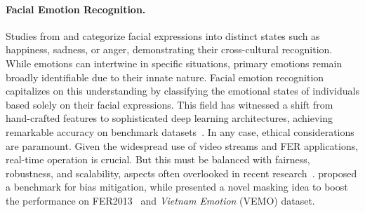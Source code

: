 \paragraph{Facial Emotion Recognition.}
Studies from \citet{ekman1971constants} and \citet{LiD22a} categorize facial expressions into distinct states 
such as happiness, sadness, or anger, 
demonstrating their cross-cultural recognition. 
While emotions can intertwine in specific situations, 
primary emotions remain broadly identifiable due to their innate nature.
Facial emotion recognition capitalizes on this understanding by classifying the emotional states of individuals based solely on their facial expressions. 
This field has witnessed a shift from hand-crafted features to sophisticated deep learning architectures, 
achieving remarkable accuracy on benchmark datasets~\cite{FardM22,LiGL22}. 
In any case, ethical considerations are paramount. 
Given the widespread use of video streams and FER applications, 
real-time operation is crucial. 
But this must be balanced with fairness, robustness, and scalability, 
aspects often overlooked in recent research~\cite{Savchenko22}. 
\citet{WangQKGNHR20} proposed a benchmark for bias mitigation, 
while \citet{PhamVT20} presented a novel masking idea to boost the performance on FER2013~\cite{BarsoumZCZ16} and \textit{Vietnam Emotion} (VEMO) dataset. 

